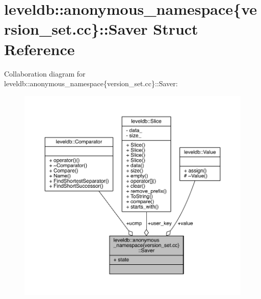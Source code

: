 \hypertarget{structleveldb_1_1anonymous__namespace_02version__set_8cc_03_1_1_saver}{}\section{leveldb\+:\+:anonymous\+\_\+namespace\{version\+\_\+set.\+cc\}\+:\+:Saver Struct Reference}
\label{structleveldb_1_1anonymous__namespace_02version__set_8cc_03_1_1_saver}


Collaboration diagram for leveldb\+:\+:anonymous\+\_\+namespace\{version\+\_\+set.\+cc\}\+:\+:Saver\+:
\nopagebreak
\begin{figure}[H]
\begin{center}
\leavevmode
\includegraphics[width=350pt]{structleveldb_1_1anonymous__namespace_02version__set_8cc_03_1_1_saver__coll__graph}
\end{center}
\end{figure}
